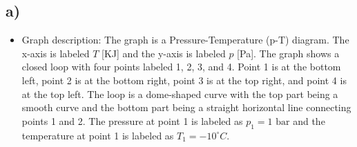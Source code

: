 

\subsection*{a)}

\begin{itemize}
    \item Graph description: The graph is a Pressure-Temperature (p-T) diagram. The x-axis is labeled $T$ [KJ] and the y-axis is labeled $p$ [Pa]. The graph shows a closed loop with four points labeled 1, 2, 3, and 4. Point 1 is at the bottom left, point 2 is at the bottom right, point 3 is at the top right, and point 4 is at the top left. The loop is a dome-shaped curve with the top part being a smooth curve and the bottom part being a straight horizontal line connecting points 1 and 2. The pressure at point 1 is labeled as $p_1 = 1 \text{ bar}$ and the temperature at point 1 is labeled as $T_1 = -10^\circ C$.
\end{itemize}